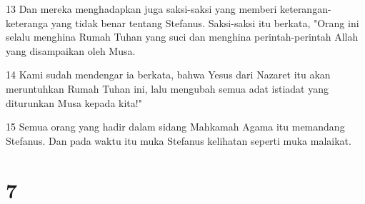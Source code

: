 \par 13 Dan mereka menghadapkan juga saksi-saksi yang memberi keterangan-keteranga yang tidak benar tentang Stefanus. Saksi-saksi itu berkata, "Orang ini selalu menghina Rumah Tuhan yang suci dan menghina perintah-perintah Allah yang disampaikan oleh Musa.
\par 14 Kami sudah mendengar ia berkata, bahwa Yesus dari Nazaret itu akan meruntuhkan Rumah Tuhan ini, lalu mengubah semua adat istiadat yang diturunkan Musa kepada kita!"
\par 15 Semua orang yang hadir dalam sidang Mahkamah Agama itu memandang Stefanus. Dan pada waktu itu muka Stefanus kelihatan seperti muka malaikat.

\chapter{7}

